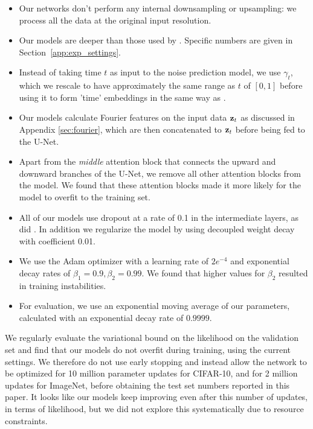 \documentclass{article}
\begin{document}
\begin{itemize}
    \item Our networks don't perform any internal downsampling or upsampling: we process all the data at the original input resolution.
    \item Our models are deeper than those used by \cite{ho2020denoising}. Specific numbers are given in Section~\ref{app:exp_settings}.
    \item Instead of taking time $t$ as input to the noise prediction model, we use $\gamma_t$, which we rescale to have approximately the same range as $t$ of $[0,1]$ before using it to form 'time' embeddings in the same way as \cite{ho2020denoising}. 
    \item Our models calculate Fourier features on the input data ${\mathbf{z}}_t$ as discussed in Appendix \ref{sec:fourier}, which are then concatenated to ${\mathbf{z}}_t$ before being fed to the U-Net.
    \item Apart from the \emph{middle} attention block that connects the upward and downward branches of the U-Net, we remove all other attention blocks from the model. We found that these attention blocks made it more likely for the model to overfit to the training set.
    \item All of our models use dropout at a rate of 0.1 in the intermediate layers, as did \cite{ho2020denoising}. In addition we regularize the model by using decoupled weight decay \citep{loshchilov2017decoupled} with coefficient 0.01.
    \item We use the Adam optimizer with a learning rate of $2e^{-4}$ and exponential decay rates of $\beta_{1}=0.9, \beta_{2}=0.99$. We found that higher values for $\beta_{2}$ resulted in training instabilities.
    \item For evaluation, we use an exponential moving average of our parameters, calculated with an exponential decay rate of $0.9999$.
\end{itemize}

%

We regularly evaluate the variational bound on the likelihood on the validation set and find that our models do not overfit during training, using the current settings. We therefore do not use early stopping and instead allow the network to be optimized for 10 million parameter updates for CIFAR-10, and for 2 million updates for ImageNet, before obtaining the test set numbers reported in this paper. It looks like our models keep improving even after this number of updates, in terms of likelihood, but we did not explore this systematically due to resource constraints.
\end{document}
